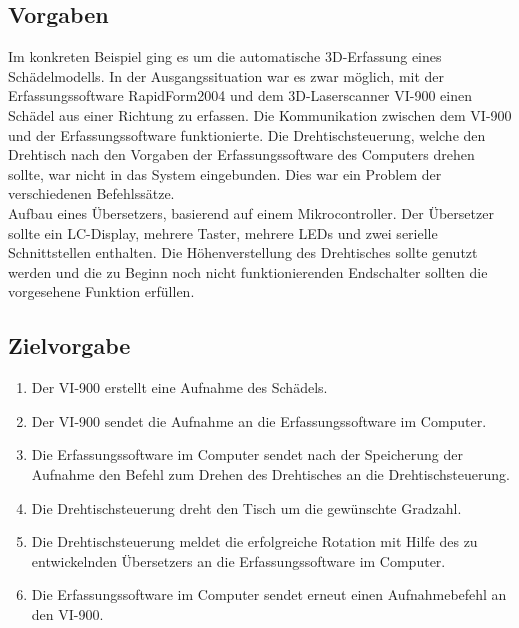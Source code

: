 
\subsection{Vorgaben}
Im konkreten Beispiel ging es um die automatische 3D-Erfassung eines Schädelmodells. In der Ausgangssituation war es zwar möglich, mit der Erfassungssoftware RapidForm2004 und dem 3D-Laserscanner VI-900  einen Schädel aus einer Richtung zu erfassen. Die Kommunikation zwischen dem VI-900 und der Erfassungssoftware funktionierte. Die Drehtischsteuerung, welche den Drehtisch nach den Vorgaben der Erfassungssoftware des Computers drehen sollte, war nicht in das System eingebunden. Dies war ein Problem der verschiedenen Befehlssätze.\\
Aufbau eines Übersetzers, basierend auf einem Mikrocontroller. Der Übersetzer sollte ein LC-Display, mehrere Taster, mehrere LEDs und zwei serielle Schnittstellen enthalten. Die Höhenverstellung des Drehtisches sollte genutzt werden und die zu Beginn noch nicht funktionierenden Endschalter sollten die vorgesehene Funktion erfüllen.
\subsection{Zielvorgabe}
\begin{enumerate}
\item Der VI-900 erstellt eine Aufnahme des Schädels.
\item Der VI-900 sendet die Aufnahme an die Erfassungssoftware im Computer.
\item Die Erfassungssoftware im Computer sendet nach der Speicherung der Aufnahme den Befehl zum Drehen des Drehtisches an die Drehtischsteuerung.
\item Die Drehtischsteuerung dreht den Tisch um die gewünschte Gradzahl.
\item Die Drehtischsteuerung meldet die erfolgreiche Rotation mit Hilfe des zu entwickelnden Übersetzers an die Erfassungssoftware im Computer.
\item Die Erfassungssoftware im Computer sendet erneut einen Aufnahmebefehl an den VI-900.
\end{enumerate}



